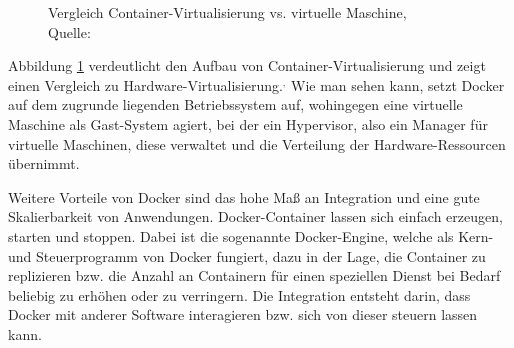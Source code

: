 \begin{figure}[h]
	\centering
	\captionsetup{justification=centering}
	\hspace{1cm}
	\caption[Vergleich Container-Virtualisierung vs. virtuelle Maschine]{\label{fig:docker_container}Vergleich Container-Virtualisierung vs. virtuelle Maschine, \\Quelle: \cite{MS-DockerInc..05.03.2019}}
\end{figure}

Abbildung \ref{fig:docker_container} verdeutlicht den Aufbau von Container-Virtualisierung und zeigt einen Vergleich zu Hardware-Virtualisierung.\autocite[Vgl.][]{MS-ChrissiKraus.27.07.2018}$^,$\autocite[Vgl.][]{MS-MicrosoftCorporation.31.08.2018} 
Wie man sehen kann, setzt Docker auf dem zugrunde liegenden Betriebssystem auf, wohingegen eine virtuelle Maschine als Gast-System agiert, bei der ein Hypervisor, also ein Manager für virtuelle Maschinen\autocite[Vgl.][]{MS-ReneBust.06.04.2010}, diese verwaltet und die Verteilung der Hardware-Ressourcen übernimmt.

Weitere Vorteile von Docker sind das hohe Maß an Integration und eine gute Skalierbarkeit von Anwendungen. 
Docker-Container lassen sich einfach erzeugen, starten und stoppen. 
Dabei ist die sogenannte Docker-Engine, welche als Kern- und Steuerprogramm von Docker fungiert, dazu in der Lage, die Container zu replizieren bzw. die Anzahl an Containern für einen speziellen Dienst bei Bedarf beliebig zu erhöhen oder zu verringern. 
Die Integration entsteht darin, dass Docker mit anderer Software interagieren bzw. sich von dieser steuern lassen kann.